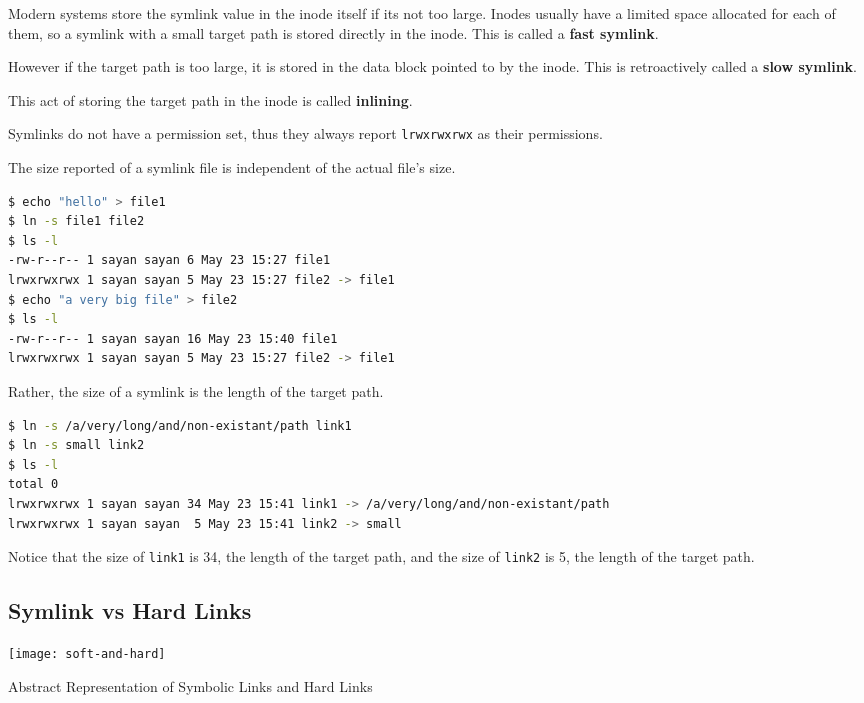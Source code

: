 Modern systems store the symlink value in the inode itself if its not too large.
Inodes usually have a limited space allocated for each of them, so a symlink with a small target path is stored directly in the inode.
This is called a \textbf{fast symlink}.

However if the target path is too large, it is stored in the data block pointed to by the inode.
This is retroactively called a \textbf{slow symlink}.

This act of storing the target path in the inode is called \textbf{inlining}.

Symlinks do not have a permission set, thus they always report \lstinline|lrwxrwxrwx| as their permissions.

The size reported of a symlink file is independent of the actual file's size.

\begin{lstlisting}[language=bash]
$ echo "hello" > file1
$ ln -s file1 file2
$ ls -l
-rw-r--r-- 1 sayan sayan 6 May 23 15:27 file1
lrwxrwxrwx 1 sayan sayan 5 May 23 15:27 file2 -> file1
$ echo "a very big file" > file2
$ ls -l
-rw-r--r-- 1 sayan sayan 16 May 23 15:40 file1
lrwxrwxrwx 1 sayan sayan 5 May 23 15:27 file2 -> file1
\end{lstlisting}

Rather, the size of a symlink is the length of the target path.

\begin{lstlisting}[language=bash]
$ ln -s /a/very/long/and/non-existant/path link1
$ ln -s small link2
$ ls -l
total 0
lrwxrwxrwx 1 sayan sayan 34 May 23 15:41 link1 -> /a/very/long/and/non-existant/path
lrwxrwxrwx 1 sayan sayan  5 May 23 15:41 link2 -> small
\end{lstlisting}

Notice that the size of \lstinline|link1| is 34, the length of the target path, and the size of \lstinline|link2| is 5, the length of the target path.

\subsection{Symlink vs Hard Links}

\begin{marginfigure}
  \texttt{[image: soft-and-hard]}
  \caption[Abstract Representation of Symbolic Links and Hard Links]{Abstract Representation of Symbolic Links and Hard Links}
\end{marginfigure}

